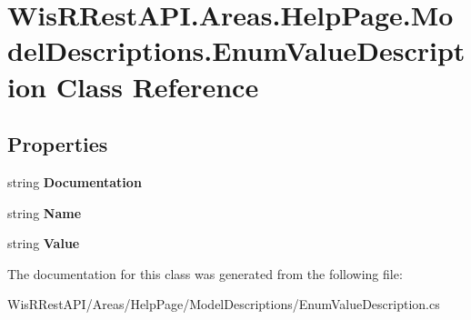 \hypertarget{class_wis_r_rest_a_p_i_1_1_areas_1_1_help_page_1_1_model_descriptions_1_1_enum_value_description}{}\section{Wis\+R\+Rest\+A\+P\+I.\+Areas.\+Help\+Page.\+Model\+Descriptions.\+Enum\+Value\+Description Class Reference}
\label{class_wis_r_rest_a_p_i_1_1_areas_1_1_help_page_1_1_model_descriptions_1_1_enum_value_description}
\subsection*{Properties}
\begin{DoxyCompactItemize}
\item 
\hypertarget{class_wis_r_rest_a_p_i_1_1_areas_1_1_help_page_1_1_model_descriptions_1_1_enum_value_description_af30b6cdb177b85c4e4fb83211b8f92df}{}string {\bfseries Documentation}\label{class_wis_r_rest_a_p_i_1_1_areas_1_1_help_page_1_1_model_descriptions_1_1_enum_value_description_af30b6cdb177b85c4e4fb83211b8f92df}

\item 
\hypertarget{class_wis_r_rest_a_p_i_1_1_areas_1_1_help_page_1_1_model_descriptions_1_1_enum_value_description_ae8af87352074ecdb3524797a47beff34}{}string {\bfseries Name}\label{class_wis_r_rest_a_p_i_1_1_areas_1_1_help_page_1_1_model_descriptions_1_1_enum_value_description_ae8af87352074ecdb3524797a47beff34}

\item 
\hypertarget{class_wis_r_rest_a_p_i_1_1_areas_1_1_help_page_1_1_model_descriptions_1_1_enum_value_description_a0ed7007f29dd01b84db694afca77615b}{}string {\bfseries Value}\label{class_wis_r_rest_a_p_i_1_1_areas_1_1_help_page_1_1_model_descriptions_1_1_enum_value_description_a0ed7007f29dd01b84db694afca77615b}

\end{DoxyCompactItemize}


The documentation for this class was generated from the following file\+:\begin{DoxyCompactItemize}
\item 
Wis\+R\+Rest\+A\+P\+I/\+Areas/\+Help\+Page/\+Model\+Descriptions/Enum\+Value\+Description.\+cs\end{DoxyCompactItemize}

